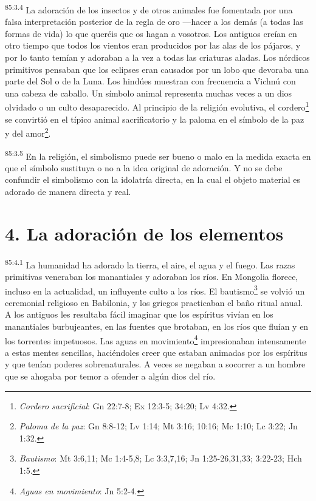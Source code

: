 \par
\textsuperscript{85:3.4} La adoración de los insectos y de otros animales fue fomentada por una falsa interpretación posterior de la regla de oro ---hacer a los demás (a todas las formas de vida) lo que queréis que os hagan a vosotros. Los antiguos creían en otro tiempo que todos los vientos eran producidos por las alas de los pájaros, y por lo tanto temían y adoraban a la vez a todas las criaturas aladas. Los nórdicos primitivos pensaban que los eclipses eran causados por un lobo que devoraba una parte del Sol o de la Luna. Los hindúes muestran con frecuencia a Vichnú con una cabeza de caballo. Un símbolo animal representa muchas veces a un dios olvidado o un culto desaparecido. Al principio de la religión evolutiva, el cordero\footnote{\textit{Cordero sacrificial}: Gn 22:7-8; Ex 12:3-5; 34:20; Lv 4:32.} se convirtió en el típico animal sacrificatorio y la paloma en el símbolo de la paz y del amor\footnote{\textit{Paloma de la paz}: Gn 8:8-12; Lv 1:14; Mt 3:16; 10:16; Mc 1:10; Lc 3:22; Jn 1:32.}.

\par
\textsuperscript{85:3.5} En la religión, el simbolismo puede ser bueno o malo en la medida exacta en que el símbolo sustituya o no a la idea original de adoración. Y no se debe confundir el simbolismo con la idolatría directa, en la cual el objeto material es adorado de manera directa y real.

\section*{4. La adoración de los elementos}
\par
\textsuperscript{85:4.1} La humanidad ha adorado la tierra, el aire, el agua y el fuego. Las razas primitivas veneraban los manantiales y adoraban los ríos. En Mongolia florece, incluso en la actualidad, un influyente culto a los ríos. El bautismo\footnote{\textit{Bautismo}: Mt 3:6,11; Mc 1:4-5,8; Lc 3:3,7,16; Jn 1:25-26,31,33; 3:22-23; Hch 1:5.} se volvió un ceremonial religioso en Babilonia, y los griegos practicaban el baño ritual anual. A los antiguos les resultaba fácil imaginar que los espíritus vivían en los manantiales burbujeantes, en las fuentes que brotaban, en los ríos que fluían y en los torrentes impetuosos. Las aguas en movimiento\footnote{\textit{Aguas en movimiento}: Jn 5:2-4.} impresionaban intensamente a estas mentes sencillas, haciéndoles creer que estaban animadas por los espíritus y que tenían poderes sobrenaturales. A veces se negaban a socorrer a un hombre que se ahogaba por temor a ofender a algún dios del río.

